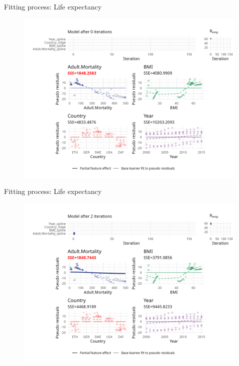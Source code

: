 
\begin{frame}{Fitting process: Life expectancy}
	\begin{figure}
		\centering
		\includegraphics[width=\textwidth]{figures/cwb-anim/fig-iter-0001.png}
	\end{figure}
	\addtocounter{framenumber}{0}
\end{frame}


\begin{frame}{Fitting process: Life expectancy}
	\begin{figure}
		\centering
		\includegraphics[width=\textwidth]{figures/cwb-anim/fig-iter-0002.png}
	\end{figure}
	\addtocounter{framenumber}{-1}
\end{frame}


